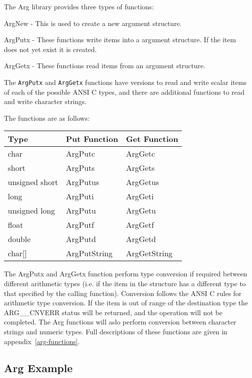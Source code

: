 The Arg library provides three types of functions:

\begin{description}

\item{ArgNew} - This is used to create a new argument structure.

\item{ArgPutx} - These functions write items into a argument structure. If the 
item does not yet exist it is created.

\item{ArgGetx} - These functions read items from an argument structure.

\end{description}

The \verb$ArgPutx$ and \verb$ArgGetx$ functions have versions to read and write
scalar items of each of the possible ANSI C types, and there are additional
functions to read and write character strings.

The functions are as follows:

\begin{tabular}{|l|l|l|}   \hline
Type & Put Function & Get Function \\  \hline 
char & ArgPutc & ArgGetc \\
short & ArgPuts & ArgGets \\
unsigned short & ArgPutus & ArgGetus \\
long & ArgPuti & ArgGeti \\
unsigned long & ArgPutu & ArgGetu \\
float & ArgPutf & ArgGetf \\
double & ArgPutd & ArgGetd \\
char[] & ArgPutString & ArgGetString \\
\hline
\end{tabular}


The ArgPutx and ArgGetx function perform type conversion if required between
different arithmetic types (i.e. if the item in the structure has a different
type to that specified by the calling function). Conversion follows the ANSI C
rules for arithmetic type conversion. If the item is out of range of the
destination type the ARG\_\_CNVERR status will be returned, and the operation
will not be completed. The Arg functions will aslo perform conversion between character strings and numeric types. Full descriptions of these functions are given in
appendix~\ref{arg-functions}.  

\subsection{Arg Example}

